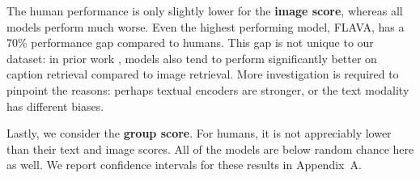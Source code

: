 \documentclass[10pt,twocolumn,letterpaper]{article}
\begin{document}
The human performance is only slightly lower for the \textbf{image score}, whereas all models perform much worse. Even the highest performing model, FLAVA, has a 70\% performance gap compared to humans. This gap is not unique to our dataset: in prior work \cite{faghri2018vse} \cite{radford2021clip}, models also tend to perform significantly better on caption retrieval compared to image retrieval. More investigation is required to pinpoint the reasons: perhaps textual encoders are stronger, or the text modality has different biases.

Lastly, we consider the \textbf{group score}. For humans, it is not appreciably lower than their text and image scores. All of the models are below random chance here as well.
We report confidence intervals for these results in Appendix~A.

\begin{table*}[!ht]
    \centering
\end{table*}
\end{document}
